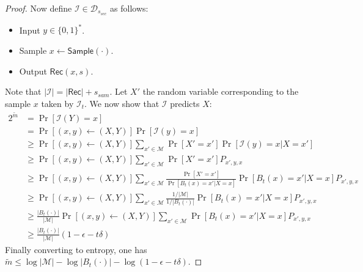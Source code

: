 \documentclass[11pt]{article}
\newcommand{\class}[1]{{\ensuremath{\mathsf{#1}}}}
\newcommand{\rec}{\ensuremath{\class{Rec}}\xspace}
\newcommand{\zo}{\ensuremath{\{0, 1\}}}
\newcommand{\sample}{\ensuremath{\class{Sample}}\xspace}
\begin{document}
\begin{proof}
Now define $\mathcal{I}\in\mathcal{D}_{s_{sec}}$ as follows:
\begin{itemize}
\item Input $y\in\zo^*$.
\item Sample $x\leftarrow \sample(\cdot)$.
\item Output $\rec(x, s)$.
\end{itemize}
Note that $|\mathcal{I}| =  |\rec|+ s_{sam}$.  Let $X'$ the random variable corresponding to the sample $x$ taken by $\mathcal{I}_t$.
We now show that $\mathcal{I}$ predicts $X$:
\begin{align*}
2^{\tilde{m}}& = \Pr[\mathcal{I}(Y) = x] \\
&= \Pr[(x, y)\leftarrow (X, Y)] \Pr[\mathcal{I}(y) = x]\\
&\geq \Pr[(x, y)\leftarrow (X, Y)] \sum_{x'\in\mathcal{M}} \Pr[X' = x' ]\Pr[\mathcal{I}(y) = x | X = x']\\
&\geq \Pr[(x, y)\leftarrow (X, Y)] \sum_{x'\in\mathcal{M}} \Pr[X' = x' ] P_{x', y, x}\\
&\geq \Pr[(x, y)\leftarrow (X, Y)] \sum_{x'\in\mathcal{M}} \frac{\Pr[X' = x']}{\Pr[B_t(x) = x' | X = x]}\Pr[B_t(x) = x' | X=x ] P_{x', y, x}\\
&\geq \Pr[(x, y)\leftarrow (X, Y)] \sum_{x'\in\mathcal{M}} \frac{1/|\mathcal{M}|}{1/|B_t(\cdot)|} \Pr[B_t(x) = x' | X=x ] P_{x', y, x}\\
&\geq \frac{|B_t(\cdot)|}{|\mathcal{M}|} \Pr[(x, y)\leftarrow (X, Y)] \sum_{x'\in\mathcal{M}} \Pr[B_t(x) = x' | X=x ] P_{x', y, x}\\
&\geq \frac{|B_t(\cdot)|}{|\mathcal{M}|}(1-\epsilon - t\delta)
\end{align*}
Finally converting to entropy, one has $\tilde{m}\leq \log |\mathcal{M}|-\log |B_t(\cdot)| - \log (1-\epsilon -t \delta)$.
\end{proof}
\end{document}
